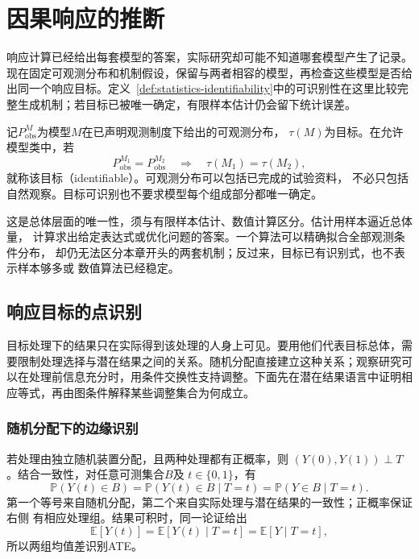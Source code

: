\section{因果响应的推断}
\label{sec:causal-effect-identification}

响应计算已经给出每套模型的答案，实际研究却可能不知道哪套模型产生了记录。现在固定可观测分布和机制假设，保留与两者相容的模型，再检查这些模型是否给出同一个响应目标。定义~\ref{def:statistics-identifiability}中的可识别性在这里比较完整生成机制；若目标已被唯一确定，有限样本估计仍会留下统计误差。

记\(P_{\mathrm{obs}}^M\)为模型\(M\)在已声明观测制度下给出的可观测分布，
\(\tau(M)\)为目标。在允许模型类中，若
\[
  P_{\mathrm{obs}}^{M_1}=P_{\mathrm{obs}}^{M_2}
  \quad\Longrightarrow\quad \tau(M_1)=\tau(M_2),
\]
就称该目标（identifiable）。可观测分布可以包括已完成的试验资料，
不必只包括自然观察。目标可识别也不要求模型每个组成部分都唯一确定。

这是总体层面的唯一性，须与有限样本估计、数值计算区分。估计用样本逼近总体量，
计算求出给定表达式或优化问题的答案。一个算法可以精确拟合全部观测条件分布，
却仍无法区分本章开头的两套机制；反过来，目标已有识别式，也不表示样本够多或
数值算法已经稳定。

\subsection{响应目标的点识别}
\label{sec:causal-point-identification}

目标处理下的结果只在实际得到该处理的人身上可见。要用他们代表目标总体，需要限制处理选择与潜在结果之间的关系。随机分配直接建立这种关系；观察研究可以在处理前信息充分时，用条件交换性支持调整。下面先在潜在结果语言中证明相应等式，再由图条件解释某些调整集合为何成立。

\subsubsection{随机分配下的边缘识别}
\label{sec:causal-randomized-identification}

若处理由独立随机装置分配，且两种处理都有正概率，则
\((Y(0),Y(1))\perp T\)。结合一致性，对任意可测集合\(B\)及
\(t\in\{0,1\}\)，有
\begin{equation}
  \mathbb P(Y(t)\in B)
  =
  \mathbb P(Y(t)\in B\mid T=t)
  =
  \mathbb P(Y\in B\mid T=t).
  \label{eq:causal-randomization-marginal-distribution}
\end{equation}
第一个等号来自随机分配，第二个来自实际处理与潜在结果的一致性；正概率保证右侧
有相应处理组。结果可积时，同一论证给出
\[
  \mathbb E[Y(t)]
  =\mathbb E[Y(t)\mid T=t]
  =\mathbb E[Y\mid T=t],
\]
所以两组均值差识别ATE。

